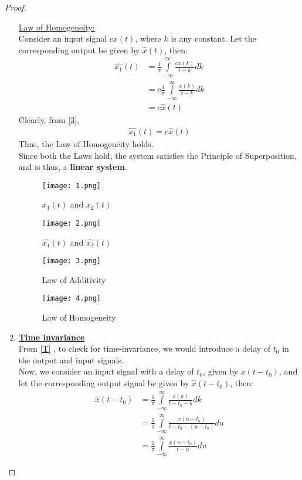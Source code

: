 \documentclass[journal,12pt,twocolumn]{IEEEtran}
\begin{document}
\begin{proof}
\begin{enumerate}
\underline{Law of Homogeneity: }\\
Consider an input signal $cx(t)$, where $k$ is any constant. Let the corresponding output be given by $\hat{x}(t)$, then:
\begin{align}
    \hat{x_1}(t) &= \frac{1}{\pi}\int\limits_{-\infty}^{\infty}\frac{cx(k)}{t-k} dk\\
    &= c\frac{1}{\pi}\int\limits_{-\infty}^{\infty}\frac{x(k)}{t-k} dk\\
     &= c\hat{x}(t)
     \label{3}
\end{align}
Clearly, from \eqref{3},
\begin{align}
    \hat{x_1}(t) = c\hat{x}(t)
\end{align}
Thus, the Law of Homogeneity holds.\\
Since both the Laws hold, the system satisfies the Principle of Superposition, and is thus, a \textbf{linear system}.

 \begin{figure}[!htp]
\centering
 \texttt{[image: 1.png]}
 \caption{$x_1(t)$ and $x_2(t)$}
 \end{figure}
 
  \begin{figure}[!htp]
\centering
 \texttt{[image: 2.png]}
 \caption{$\hat{x_1}(t)$ and $\hat{x_2}(t)$}
 \label{fig2}
 \end{figure}
 
  \begin{figure}[!htp]
\centering
 \texttt{[image: 3.png]}
 \caption{Law of Additivity}
 \end{figure}
 
  \begin{figure}[!htp]
\centering
 \texttt{[image: 4.png]}
 \caption{Law of Homogeneity}
 \end{figure}


\item \textbf{\underline{Time invariance}}\\
From \eqref{T} , to check for time-invariance, we would introduce a delay of $t_0$ in the output and input signals.\\
Now, we consider an input signal with a delay of $t_0$, given by $x(t-t_0)$, and let the corresponding output signal be given by $\hat{x}(t-t_0)$, then:
\begin{align}
    \hat{x}(t-t_0) &= \frac{1}{\pi}\int\limits_{-\infty}^{\infty}\frac{x(k)}{t-t_0-k} dk\label{4}\\
    &= \frac{1}{\pi}\int\limits_{-\infty}^{\infty}\frac{x(u-t_0)}{t-t_0-(u-t_0)} du\\
    &= \frac{1}{\pi}\int\limits_{-\infty}^{\infty}\frac{x(u-t_0)}{t-u} du\label{01}
\end{align}


\end{enumerate}
\end{proof}
\end{document}
